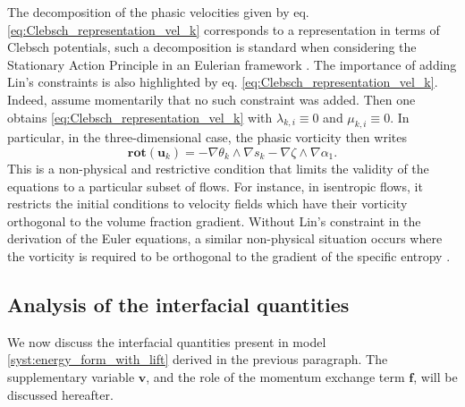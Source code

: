 \documentclass{myclass}
\newcommand{\vel}{\bm{u}}
\newcommand{\lift}{\bm{f}}
\newcommand{\rot}{\mathbf{rot}}
\begin{document}
The decomposition of the phasic velocities given by eq. \eqref{eq:Clebsch_representation_vel_k} corresponds to a representation in terms of Clebsch potentials, such a decomposition is standard when considering the Stationary Action Principle in an Eulerian framework \cite{bretherton:1970}. The importance of adding Lin's constraints is also highlighted by eq. \eqref{eq:Clebsch_representation_vel_k}. Indeed, assume momentarily that no such constraint was added. Then one obtains \eqref{eq:Clebsch_representation_vel_k} with $\lambda_{k,i}\equiv0$ and $\mu_{k,i}\equiv0$. In particular, in the three-dimensional case, the phasic vorticity then writes
\begin{equation}
\rot(\vel_k)= -\nabla\theta_k \wedge \nabla s_k - \nabla\zeta\wedge\nabla\alpha_1.
\end{equation}
This is a non-physical and restrictive condition that limits the validity of the equations to a particular subset of flows. For instance, in isentropic flows, it restricts the initial conditions to velocity fields which have their vorticity orthogonal to the volume fraction gradient. Without Lin's constraint in the derivation of the Euler equations, a similar non-physical situation occurs where the vorticity is required to be orthogonal to the  gradient of the specific entropy \cite{bretherton:1970}.

\subsection{Analysis of the interfacial quantities}

We now discuss the interfacial quantities present in model \eqref{syst:energy_form_with_lift} derived in the previous paragraph. The supplementary variable $\bm{v}$, and the role of the momentum exchange term $\lift$, will be discussed hereafter.
\end{document}
